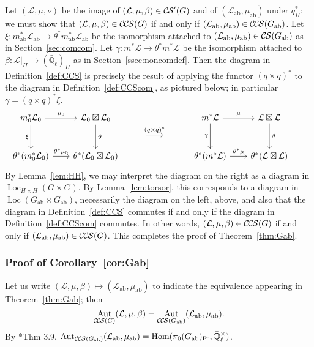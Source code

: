 \documentclass[10pt]{amsart}
\theoremstyle{plain}
\theoremstyle{definition}
\newcommand{\EE}{\mathbb{\bar Q}_\ell}
\newcommand{\EEx}{\EE^\times}
\newcommand{\Frob}[1]{\operatorname{Fr}_{#1}}
\DeclareMathOperator{\Aut}{Aut}
\DeclareMathOperator{\Hom}{Hom}
\DeclareMathOperator{\Loc}{Loc}
\newcommand{\ab}{_{\operatorname{ab}}}
\newcommand{\cs}[1]{{\mathcal{#1}}}
\newcommand{\CS}{{\mathcal{C\hskip-0.8pt S}}}
\newcommand{\CCS}{{\mathcal{C\hskip-.8pt C\hskip-0.8pt S}}}
\begin{document}
Let $(\cs{L},\mu,\nu)$ be the image of $(\cs{L},\mu,\beta)\in \CS'(G)$ and of $(\cs{L}\ab,\mu\ab)$ under $q_H^*$;
we must show that $(\cs{L},\mu,\beta)\in \CCS(G)$ if and only if $(\cs{L}\ab,\mu\ab)\in \CCS(G\ab)$.
Let $\xi : m\ab^*\cs{L}\ab \to \theta^* m\ab^*\cs{L}\ab$ be the isomorphism attached to $(\cs{L}\ab,\mu\ab)\in \CS(G\ab)$ as in Section~\ref{sec:comcom}.
Let $\gamma : m^*\cs{L} \to \theta^* m^*\cs{L}$ be the isomorphism attached to $\beta : \cs{L}\vert_{H} \to (\EE)_{H}$ as in Section~\ref{ssec:noncomdef}.
Then the diagram in Definition~\ref{def:CCS} is precisely the result of applying the functor $(q\times q)^*$ to the diagram in Definition~\ref{def:CCScom}, as pictured below; 
in particular $\gamma = (q\times q)^* \xi$.
  \[
  \begin{tikzcd}[row sep=10, column sep = 20]
   m_0^*\cs{L}_0 \arrow{dd}[swap]{\xi} \arrow{r}{\mu_0} 
   & \cs{L}_0\boxtimes\cs{L}_0 \arrow{dd}{\vartheta}
&&&   m^*\cs{L} \arrow{dd}[swap]{\gamma} \arrow{r}{\mu} 
 & \cs{L}\boxtimes\cs{L} \arrow{dd}{\vartheta}\\
 && \arrow{r}{(q\times q)^*}  &\ & & &\\ 
   \theta^*(m_0^*\cs{L}_0) \arrow{r}{{\theta}^*\mu_0} 
 &  \theta^*(\cs{L}_0\boxtimes\cs{L}_0)
&&&   \theta^*(m^*\cs{L}) \arrow{r}{{\theta}^*\mu} 
&  \theta^*(\cs{L}\boxtimes\cs{L})
  \end{tikzcd}
\]
By Lemma~\ref{lem:HH}, we may interpret the diagram on the right as a diagram in $\Loc_{H\times H}(G\times G)$.
By Lemma~\ref{lem:torsor}, this corresponds to a diagram in $\Loc(G\ab\times G\ab)$, necessarily the diagram on the left, above, and also that the diagram in Definition~\ref{def:CCS} commutes if and only if the diagram in Definition~\ref{def:CCScom} commutes. 
In other words, $(\cs{L},\mu,\beta)\in \CCS(G)$
if and only if $(\cs{L}\ab,\mu\ab)\in \CCS(G)$.
This completes the proof of Theorem~\ref{thm:Gab}.

\subsubsection{Proof of Corollary~\ref{cor:Gab}}\label{ssec:proof3}

Let us write $(\cs{L},\mu,\beta) \mapsto (\cs{L}\ab,\mu\ab)$ to indicate the equivalence appearing in Theorem~\ref{thm:Gab};
then \[\Aut_{\CCS(G)}(\cs{L},\mu,\beta) = \Aut_{\CCS(G\ab)}(\cs{L}\ab,\mu\ab).\] 
By \cite{cunningham-roe:13a}*{Thm 3.9},  $\Aut_{\CCS(G\ab)}(\cs{L}\ab,\mu\ab) = \Hom(\pi_0(G\ab)_{\Frob{}},\EEx)$.
\end{document}
